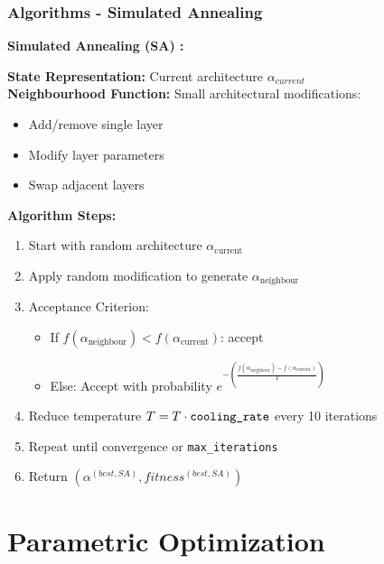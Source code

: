 \documentclass{beamer}
\begin{document}
    \begin{frame}
        \frametitle{Algorithms - Simulated Annealing}
        \textbf{Simulated Annealing (SA) \cite{kuo_neural_2022}:} \\
        {
            \footnotesize
            \textbf{State Representation:} Current architecture $\alpha_{current}$ \\ 

            \textbf{Neighbourhood Function:} Small architectural modifications: 
            \begin{itemize}
                \item Add/remove single layer 
                \item Modify layer parameters 
                \item Swap adjacent layers
            \end{itemize}

            \textbf{Algorithm Steps:}
            \begin{enumerate}
                \item Start with random architecture $\alpha_\text{current}$
                \item Apply random modification to generate $\alpha_\text{neighbour}$ 
                \item Acceptance Criterion: 
                \begin{itemize}
                    \item If $f(\alpha_\text{neighbour}) < f(\alpha_\text{current})$: accept 
                    \item Else: Accept with probability $e^{-\left(\frac{f(\alpha_\text{neighbour}) - f(\alpha_\text{current})}{T}\right)}$
                \end{itemize}
                \item Reduce temperature $T = T \cdot \text{\texttt{cooling\_rate}}$ every 10 iterations
                \item Repeat until convergence or \texttt{max\_iterations}
                \item Return $(\alpha^{(best, SA)}, fitness^{(best, SA)})$
            \end{enumerate}
        }
    \end{frame}

    \section{Parametric Optimization}
\end{document}
